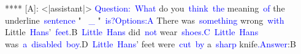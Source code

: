 \documentclass{article}
\begin{document}
\begin{tcolorbox}[colframe=black,colback=white]
****
[A]:
<|assistant|>
\textcolor{blue}{Question}\textcolor{blue}{:}\textcolor{blue}{~What} do you\textcolor{blue}{~think}\textcolor{blue}{~the} meaning\textcolor{blue}{~of} the underline\textcolor{blue}{~sentence} " \textcolor{blue}{~\_}  "\textcolor{blue}{~is}\textcolor{blue}{?}\textcolor{blue}{Options}\textcolor{blue}{:A} There was\textcolor{blue}{~something} wrong\textcolor{blue}{~with} Little\textcolor{blue}{~Hans}'\textcolor{blue}{~feet}.B\textcolor{blue}{~Little}\textcolor{blue}{~Hans} did\textcolor{blue}{~not} wear\textcolor{blue}{~shoes}\textcolor{blue}{.C}\textcolor{blue}{~Little}\textcolor{blue}{~Hans} was\textcolor{blue}{~a}\textcolor{blue}{~disabled}\textcolor{blue}{~boy}.D\textcolor{blue}{~Little}\textcolor{blue}{~Hans}' feet were\textcolor{blue}{~cut}\textcolor{blue}{~by} a\textcolor{blue}{~sharp} knife\textcolor{blue}{.An}\textcolor{blue}{swer}:B\textcolor{blue}{}
\end{tcolorbox}
\end{document}
